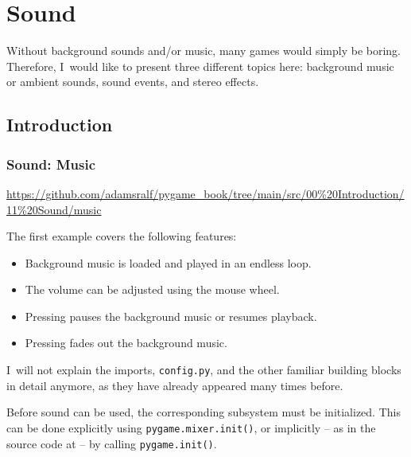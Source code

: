 \newpage
\section{Sound}
Without background sounds and/or music, many games would simply be boring.  
Therefore, I~would like to present three different topics here: background music or ambient sounds, sound events, and stereo effects.

\subsection{Introduction}

\subsubsection{Sound: Music}
\begin{diskbox}
	\url{https://github.com/adamsralf/pygame_book/tree/main/src/00%20Introduction/11%20Sound/music}
\end{diskbox}

The first example covers the following features:
\begin{itemize}
	\item Background music is loaded and played in an endless loop.
	\item The volume can be adjusted using the mouse wheel.
	\item Pressing  pauses the background music or resumes playback.
	\item Pressing  fades out the background music.
\end{itemize}

I~will not explain the imports, \texttt{config.py}, and the other familiar building blocks in detail anymore, as they have already appeared many times before.


Before sound can be used, the corresponding subsystem must be initialized. This can be done explicitly using \texttt{pygame.mixer.init()}, or implicitly -- as in the source code at  -- by calling \texttt{pygame.init()}.  

